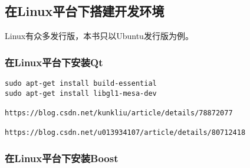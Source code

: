 ﻿%




%


\subsection{
在Linux平台下搭建开发环境
}\label{s000210}


Linux有众多发行版，本书只以Ubuntu发行版为例。


\subsubsection{
在Linux平台下安装Qt
}\label{ss000410}



\label{command000000}    %
\begin{lstlisting}[caption=GoodLuck,
title=\commandnumbernameone \thecommandnumber
]
sudo apt-get install build-essential
sudo apt-get install libgl1-mesa-dev

https://blog.csdn.net/kunkliu/article/details/78872077

https://blog.csdn.net/u013934107/article/details/80712418
\end{lstlisting}          %





\subsubsection{
在Linux平台下安装Boost
}\label{ss000510}















